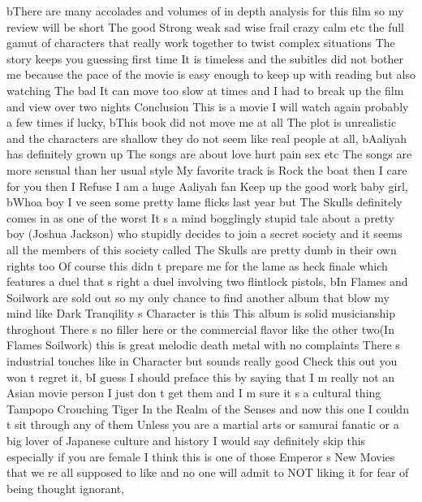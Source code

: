 \documentclass[
]{article}
\newenvironment{Shaded}{}{}
\newcommand{\NormalTok}[1]{#1}
\newcommand{\StringTok}[1]{\textcolor[rgb]{0.25,0.44,0.63}{#1}}
\begin{document}
\begin{Shaded}
\begin{Highlighting}[]
\NormalTok{       b}\StringTok{\textquotesingle{}There are many accolades and volumes of in depth analysis for this film so my review will be short The good Strong weak sad wise frail crazy calm etc the full gamut of characters that really work together to twist complex situations The story keeps you guessing first time It is timeless and the subitles did not bother me because the pace of the movie is easy enough to keep up with reading but also watching The bad It can move too slow at times and I had to break up the film and view over two nights Conclusion This is a movie I will watch again probably a few times if lucky\textquotesingle{}}\NormalTok{,}
\NormalTok{       b}\StringTok{\textquotesingle{}This book did not move me at all The plot is unrealistic and the characters are shallow they do not seem like real people at all\textquotesingle{}}\NormalTok{,}
\NormalTok{       b}\StringTok{\textquotesingle{}Aaliyah has definitely grown up The songs are about love hurt pain sex etc The songs are more sensual than her usual style My favorite track is Rock the boat then I care for you then I Refuse I am a huge Aaliyah fan Keep up the good work baby girl\textquotesingle{}}\NormalTok{,}
\NormalTok{       b}\StringTok{\textquotesingle{}Whoa boy I ve seen some pretty lame flicks last year but The Skulls definitely comes in as one of the worst It s a mind bogglingly stupid tale about a pretty boy (Joshua Jackson) who stupidly decides to join a secret society and it seems all the members of this society called The Skulls are pretty dumb in their own rights too Of course this didn t prepare me for the lame as heck finale which features a duel that s right a duel involving two flintlock pistols\textquotesingle{}}\NormalTok{,}
\NormalTok{       b}\StringTok{\textquotesingle{}In Flames and Soilwork are sold out so my only chance to find another album that blow my mind like Dark Tranqility s Character is this This album is solid musicianship throghout There s no filler here or the commercial flavor like the other two(In Flames Soilwork) this is great melodic death metal with no complaints There s industrial touches like in Character but sounds really good Check this out you won t regret it\textquotesingle{}}\NormalTok{,}
\NormalTok{       b}\StringTok{\textquotesingle{}I guess I should preface this by saying that I m really not an Asian movie person I just don t get them and I m sure it s a cultural thing Tampopo Crouching Tiger In the Realm of the Senses and now this one I couldn t sit through any of them Unless you are a martial arts or samurai fanatic or a big lover of Japanese culture and history I would say definitely skip this especially if you are female I think this is one of those Emperor s New Movies that we re all supposed to like and no one will admit to NOT liking it for fear of being thought ignorant\textquotesingle{}}\NormalTok{,}

\end{Highlighting}
\end{Shaded}
\end{document}

